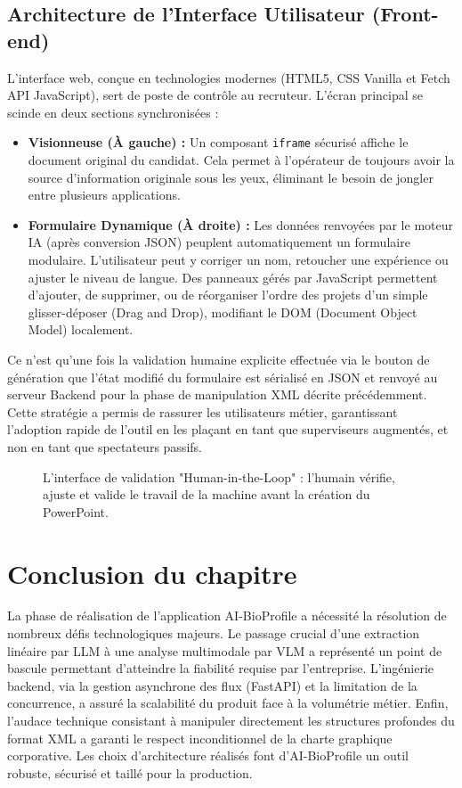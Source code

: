 \subsection{Architecture de l'Interface Utilisateur (Front-end)}
L'interface web, conçue en technologies modernes (HTML5, CSS Vanilla et Fetch API JavaScript), sert de poste de contrôle au recruteur.
L'écran principal se scinde en deux sections synchronisées :
\begin{itemize}
    \item \textbf{Visionneuse (À gauche) :} Un composant \texttt{iframe} sécurisé affiche le document original du candidat. Cela permet à l'opérateur de toujours avoir la source d'information originale sous les yeux, éliminant le besoin de jongler entre plusieurs applications.
    \item \textbf{Formulaire Dynamique (À droite) :} Les données renvoyées par le moteur IA (après conversion JSON) peuplent automatiquement un formulaire modulaire. L'utilisateur peut y corriger un nom, retoucher une expérience ou ajuster le niveau de langue. Des panneaux gérés par JavaScript permettent d'ajouter, de supprimer, ou de réorganiser l'ordre des projets d'un simple glisser-déposer (Drag and Drop), modifiant le DOM (Document Object Model) localement.
\end{itemize}

Ce n'est qu'une fois la validation humaine explicite effectuée via le bouton de génération que l'état modifié du formulaire est sérialisé en JSON et renvoyé au serveur Backend pour la phase de manipulation XML décrite précédemment.
Cette stratégie a permis de rassurer les utilisateurs métier, garantissant l'adoption rapide de l'outil en les plaçant en tant que superviseurs augmentés, et non en tant que spectateurs passifs.

\begin{figure}[H]
    \centering
    \vspace{7.5cm} %
    \caption{L'interface de validation "Human-in-the-Loop" : l'humain vérifie, ajuste et valide le travail de la machine avant la création du PowerPoint.}
    \label{fig:human_validation_ui}
\end{figure}


\section{Conclusion du chapitre}
La phase de réalisation de l'application AI-BioProfile a nécessité la résolution de nombreux défis technologiques majeurs. Le passage crucial d'une extraction linéaire par LLM à une analyse multimodale par VLM a représenté un point de bascule permettant d'atteindre la fiabilité requise par l'entreprise. L'ingénierie backend, via la gestion asynchrone des flux (FastAPI) et la limitation de la concurrence, a assuré la scalabilité du produit face à la volumétrie métier. Enfin, l'audace technique consistant à manipuler directement les structures profondes du format XML a garanti le respect inconditionnel de la charte graphique corporative. Les choix d'architecture réalisés font d'AI-BioProfile un outil robuste, sécurisé et taillé pour la production.
